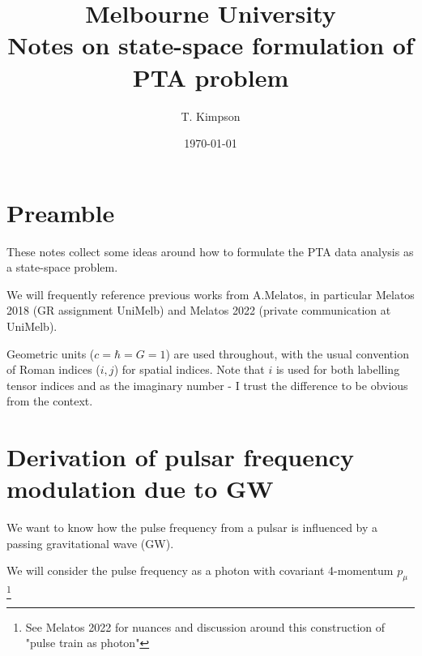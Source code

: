 \documentclass{tufte-handout} %
\title{	
	\normalfont\normalsize 
	{Melbourne University} \\ [0pt] %
	\huge Notes on state-space formulation of PTA problem%
}\author{T. Kimpson} %
\date{\vspace{-5pt}\normalsize\today} %
\begin{document}
\justifying 
\maketitle


\tableofcontents




\section{Preamble}


These notes collect some ideas around how to formulate the PTA data analysis as a state-space problem. \newline 

\noindent We will frequently reference previous works from A.Melatos, in particular Melatos 2018 (GR assignment UniMelb) and Melatos 2022 (private communication at UniMelb). \newline 

\noindent Geometric units ($c=\hbar = G = 1$) are used throughout, with the usual convention of Roman indices ($i,j$) for spatial indices. Note that $i$ is used for both labelling tensor indices and as the imaginary number - I trust the difference to be obvious from the context.\newline



\section{Derivation of pulsar frequency modulation due to GW}
We want to know how the pulse frequency from a pulsar is influenced by a passing gravitational wave (GW). \newline 

\noindent We will consider the pulse frequency as a photon with covariant 4-momentum $p_{\mu}$  \footnote{See Melatos 2022 for nuances and discussion around this construction of "pulse train as photon"} \newline 
\end{document}
